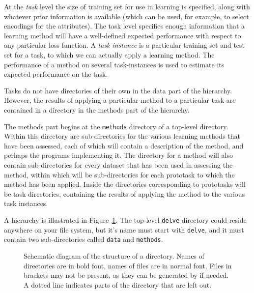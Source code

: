 At the \emph{task} level the size of training set for use in learning
is specified, along with whatever prior information is available
(which can be used, for example, to select encodings for the
attributes).  The task level specifies enough information that a
learning method will have a well-defined expected performance with
respect to any particular loss function.  A \emph{task instance} is a
particular training set and test set for a task, to which we can
actually apply a learning method.  The performance of a method on
several task-instances is used to estimate its expected performance on
the task.

Tasks do not have directories of their own in the data part of the
\delve{} hierarchy.  However, the results of applying a particular
method to a particular task are contained in a directory in the
methods part of the \delve{} hierarchy.

The methods part begins at the \texttt{methods} directory of a top-level
\delve{} directory.  Within this directory are sub-directories for the
various learning methods that have been assessed, each of which will
contain a description of the method, and perhaps the programs
implementing it.  The directory for a method will also contain
sub-directories for every dataset that has been used in assessing the
method, within which will be sub-directories for each prototask to
which the method has been applied.  Inside the directories
corresponding to prototasks will be task directories, containing the
results of applying the method to the various task instances.

A \delve{} hierarchy is illustrated in Figure~\ref{fig-my_method}.
The top-level \texttt{delve} directory could reside anywhere on your file
system, but it's name must start with \texttt{delve}, and it must contain
two sub-directories called \texttt{data} and \texttt{methods}.

\begin{figure}[t]
  \vspace{2mm}\par
  \centerline{\hsize {}}
  \caption[Schematic diagram of the structure of a \delve{} directory.]
  {Schematic diagram of the structure of a \delve{} directory.
  Names of directories are in bold font, names of files are in normal
  font. Files in brackets may not be present, as they can be
  generated by \delve{} if needed. A dotted line indicates parts of the
  directory that are left out.}\label{fig-my_method}
\end{figure}

